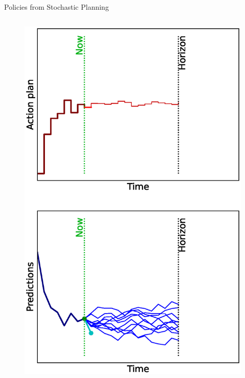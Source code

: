 \documentclass[lecture]{beamer}
\begin{document}
\begin{frame}{\normalsize Policies from Stochastic Planning}
\begin{columns}
\begin{overlayarea}{\textwidth}{0.9\textheight}
\begin{figure}
{          \includegraphics[width=\FS\textwidth,clip]{Codes/MPC/MPCMC7.eps}
        }%
    \end{figure}
  \end{overlayarea}  





\end{columns}
\end{frame}
\end{document}
